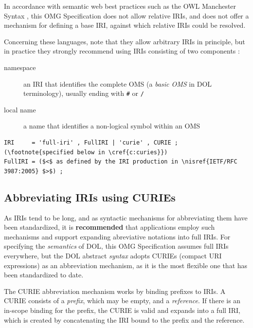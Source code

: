 \documentclass[10pt,%
\ifpretendfinal
final%
\else
draft%
\fi,
]{scrreprt}
\newcommand*{\syntax}[1]{\texttt{#1}}
\newcommand*{\recommended}{\textbf{recommended}\xspace}
\newcommand*{\IS}{OMG Specification\xspace}
\newcommand{\clauserefname}{clause}
\newcommand{\cref}[1]{\clauserefname~\ref{#1}}
\newcommand{\ssclause}[1]{\subsection{#1}}
\newcommand{\nisref}[1]{#1}
\begin{document}
In accordance with semantic web best practices such as the OWL Manchester Syntax 
\cite{W3C:NOTE-owl2-manchester-syntax-20091027}, this \IS does not allow relative IRIs, and does 
not offer a mechanism for defining a base IRI, against which relative IRIs could be resolved.

Concerning these languages, note that they allow arbitrary IRIs in principle, but in practice they 
strongly recommend using IRIs consisting of two components \cite{W3C:NOTE-swbp-vocab-pub-20080828}:
\begin{description}
\item[namespace] an IRI that identifies the complete OMS (a \emph{basic OMS} in DOL terminology), 
usually ending with \syntax{\#} or \syntax{/}
\item[local name] a name that identifies a non-logical symbol within an OMS
\end{description}

\begin{lstlisting}[language=ebnf,escapeinside={()}]  % abstract syntax
IRI     = 'full-iri' , FullIRI | 'curie' , CURIE ; (\footnote{specified below in \cref{c:curies}}) 
FullIRI = ($<$ as defined by the IRI production in \nisref{IETF/RFC 3987:2005} $>$) ;
\end{lstlisting}

\ssclause{Abbreviating IRIs using CURIEs}\label{c:curies}

As IRIs tend to be long, and as syntactic mechanisms for abbreviating them have been standardized, 
it is \recommended that applications employ such mechanisms and support expanding abreviative 
notations into full IRIs.  For specifying the \emph{semantics} of DOL, this \IS assumes full IRIs 
everywhere, but the DOL abstract \emph{syntax} adopts CURIEs (compact URI expressions) as an 
abbreviation mechanism, as it is the most flexible one that has been standardized to date.  

The CURIE abbreviation mechanism works by binding prefixes to IRIs.  A CURIE consists of a 
\emph{prefix}, which may be empty, and a \emph{reference}.  If there is an in-scope binding for the 
prefix, the CURIE is valid and expands into a full IRI, which is created by concatenating the IRI 
bound to the prefix and the reference.
\end{document}
